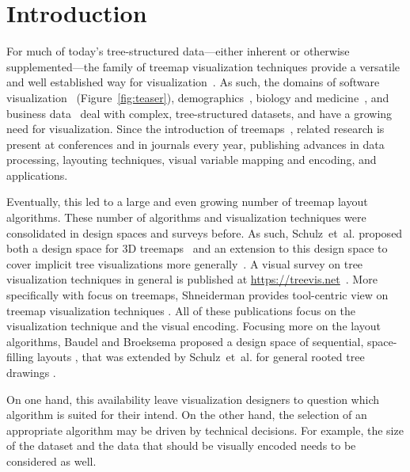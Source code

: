 \documentclass[sigconf%
,natbib=true%
]{acmart}
\begin{document}
\maketitle
\section{Introduction}
For much of today's tree-structured data---either inherent or otherwise supplemented---the family of treemap visualization techniques provide a versatile and well established way for visualization~\cite{mcnabb2017-surveyofsurveys}.
As such, the domains of software visualization~\cite{limberger2019-softwaremap} (Figure~\ref{fig:teaser}), demographics~\cite{jern2009-regionalstatistics}, biology and medicine~\cite{chazard2006-medicaldata}, and business data~\cite{roberts2018-businessdata} deal with complex, tree-structured datasets, and have a growing need for visualization.
Since the introduction of treemaps~\cite{johnson1991-spacefilling}, related research is present at conferences and in journals every year, publishing advances in data processing, layouting techniques, visual variable mapping and encoding, and applications.
\par
Eventually, this led to a large and even growing number of treemap layout algorithms.
These number of algorithms and visualization techniques were consolidated in design spaces and surveys before.
As such, Schulz~et~al. proposed both a design space for 3D treemaps~\cite{schulz2007-poster} and an extension to this design space to cover implicit tree visualizations more generally~\cite{schulz2011-implicit}.
A visual survey on tree visualization techniques in general is published at \href{treevis.net}{https://treevis.net}~\cite{schulz2011-treevis}.
More specifically with focus on treemaps, Shneiderman provides tool-centric view on treemap visualization techniques \cite{shneiderman2009-treemaps}.
All of these publications focus on the visualization technique and the visual encoding.
Focusing more on the layout algorithms, Baudel and Broeksema proposed a design space of sequential, space-filling layouts \cite{baudel2012-designspace}, that was extended by Schulz~et~al. for general rooted tree drawings \cite{schulz2013-generativelayout}.
\par
On one hand, this availability leave visualization designers to question which algorithm is suited for their intend.
On the other hand, the selection of an appropriate algorithm may be driven by technical decisions.
For example, the size of the dataset and the data that should be visually encoded needs to be considered as well.
\end{document}
